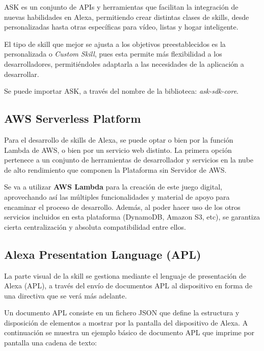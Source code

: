 ASK es un conjunto de APIs y herramientas que facilitan la integración de nuevas habilidades en Alexa, permitiendo crear distintas clases de skills, desde personalizadas hasta otras específicas para vídeo, listas y hogar inteligente.

El tipo de skill que mejor se ajusta a los objetivos preestablecidos es la personalizada o \textit{Custom Skill}, pues esta permite más flexibilidad a los desarrolladores, permitiéndoles adaptarla a las necesidades de la aplicación a desarrollar.

Se puede importar ASK, a través del nombre de la biblioteca: \textit{ask-sdk-core}.

\subsection{AWS Serverless Platform}

Para el desarrollo de skills de Alexa, se puede optar o bien por la función Lambda de AWS, o bien por un servicio web distinto. La primera opción pertenece a un conjunto de herramientas de desarrollador y servicios en la nube de alto rendimiento que componen la Plataforma sin Servidor de AWS.

Se va a utilizar \textbf{AWS Lambda} para la creación de este juego digital, aprovechando así las múltiples funcionalidades y material de apoyo para encaminar el proceso de desarrollo. Además, al poder hacer uso de los otros servicios incluidos en esta plataforma (DynamoDB, Amazon S3, etc), se garantiza cierta centralización y absoluta compatibilidad entre ellos.

\subsection{Alexa Presentation Language (APL)}

La parte visual de la skill se gestiona mediante el lenguaje de presentación de Alexa (APL), a través del envío de documentos APL al dispositivo en forma de una directiva que se verá más adelante.

Un documento APL consiste en un fichero JSON que define la estructura y disposición de elementos a mostrar por la pantalla del dispositivo de Alexa.
A continuación se muestra un ejemplo básico de documento APL que imprime por pantalla una cadena de texto:

